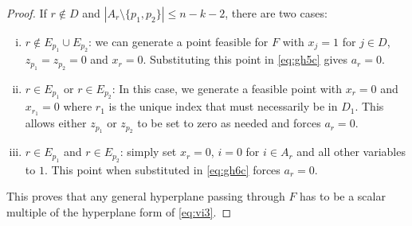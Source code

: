 \documentclass[12pt]{article}
\newcommand{\sm}{\setminus}
\begin{document}
\begin{proof}
If $r \notin D$ and $|A_r \sm \{p_1,p_2\}| \leq n-k-2$, there are two cases:
\begin{enumerate}[(i)]
\item $r \notin E_{p_1} \cup E_{p_2}$: we can generate a point feasible for $F$ with $x_j = 1$ for $j \in D$, $z_{p_1} = z_{p_2} = 0$ and $x_r = 0$. Substituting this point in \eqref{eq:gh5c} gives $a_r = 0$.
\item $r \in E_{p_1}$ or $r \in E_{p_2}$: In this case, we generate a feasible point with $x_r = 0$ and $x_{r_1} = 0$ where $r_1$ is the unique index that must necessarily be in $D_1$. This allows either $z_{p_1}$ or $z_{p_2}$ to be set to zero as needed and forces $a_r = 0$.
\item $r \in E_{p_1}$ and $r \in E_{p_2}$: simply set $x_r = 0$, $i=0$ for $i \in A_r$ and all other variables to $1$. This point when substituted in \eqref{eq:gh6c} forces $a_r = 0$.
\end{enumerate}
This proves that any general hyperplane passing through $F$ has to be a scalar multiple of the hyperplane form of \eqref{eq:vi3}.
\end{proof}
\end{document}
